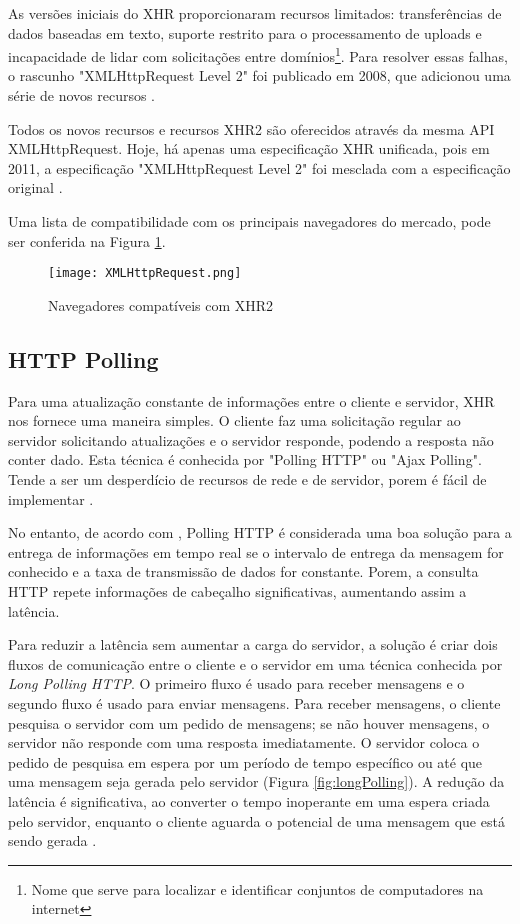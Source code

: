 \begin{citacao}
	As versões iniciais do XHR proporcionaram recursos limitados: transferências de dados baseadas em texto, suporte restrito para o processamento de uploads e incapacidade de lidar com solicitações entre domínios\footnote{Nome que serve para localizar e identificar conjuntos de computadores na internet}. Para resolver essas falhas, o rascunho "XMLHttpRequest Level 2" foi publicado em 2008, que adicionou uma série de novos recursos \cite[P.~262-263]{grigorik2013high}.
\end{citacao}

Todos os novos recursos e recursos XHR2 são oferecidos através da mesma API XMLHttpRequest. Hoje, há apenas uma especificação XHR unificada, pois em 2011, a especificação "XMLHttpRequest Level 2" foi mesclada com a especificação original \cite{grigorik2013high}.

Uma lista de compatibilidade com os principais navegadores do mercado, pode ser conferida na Figura \ref{fig:xhr2}.

\begin{figure}[!htb]
	\centering
	\texttt{[image: XMLHttpRequest.png]}
	\caption{Navegadores compatíveis com XHR2}
	\label{fig:xhr2}
\end{figure}

\subsection{HTTP Polling}

Para uma atualização constante de informações entre o cliente e servidor, XHR nos fornece uma maneira simples. O cliente faz uma solicitação regular ao servidor solicitando atualizações e o servidor responde, podendo a resposta não conter dado. Esta técnica é conhecida por "Polling HTTP" ou "Ajax Polling". Tende a ser um desperdício de recursos de rede e de servidor, porem é fácil de implementar \cite{mccarthy2009comet}.

No entanto, de acordo com , Polling HTTP é considerada uma boa solução para a entrega de informações em tempo real se o intervalo de entrega da mensagem for conhecido e  a taxa de transmissão de dados for constante. Porem, a consulta HTTP repete informações de cabeçalho significativas, aumentando assim a latência.

Para reduzir a latência sem aumentar a carga do servidor, a solução é criar dois fluxos de comunicação entre o cliente e o servidor em uma técnica conhecida por \emph{Long Polling HTTP}. O primeiro fluxo é usado para receber mensagens e o segundo fluxo é usado para enviar mensagens. Para receber mensagens, o cliente pesquisa o servidor com um pedido de mensagens; se não houver mensagens, o servidor não responde com uma resposta imediatamente. O servidor coloca o pedido de pesquisa em espera por um período de tempo específico ou até que uma mensagem seja gerada pelo servidor  (Figura \ref{fig:longPolling}). A redução da latência é significativa, ao converter o tempo inoperante em uma espera criada pelo servidor, enquanto o cliente aguarda o potencial de uma mensagem que está sendo gerada \cite{gross2006introduction}.

